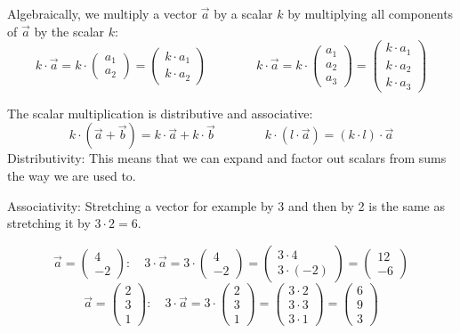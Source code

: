 \documentclass[12pt,eng]{skript_ogg}
\begin{document}
\begin{wichtig}
Algebraically, we multiply a vector $\vec{a}$ by a scalar $k$ by multiplying all components of $\vec{a}$ by the scalar $k$:
\[k\cdot\vec{a}=k\cdot
\begin{pmatrix}
a_1\\a_2
\end{pmatrix}=\begin{pmatrix}
k\cdot a_1\\k\cdot a_2
\end{pmatrix}\qquad\qquad k\cdot\vec{a}=k\cdot
\begin{pmatrix}
a_1\\a_2\\a_3
\end{pmatrix}=\begin{pmatrix}
k\cdot a_1\\k\cdot a_2\\k\cdot a_3
\end{pmatrix}\]
\end{wichtig}

\begin{bemerkung}
The scalar multiplication is distributive and associative:
\[k\cdot(\vec{a}+\vec{b})=k\cdot\vec{a}+k\cdot\vec{b}\qquad\qquad k\cdot(l\cdot\vec{a})=(k\cdot l)\cdot\vec{a}\]
Distributivity: This means that we can expand and factor out scalars from sums the way we are used to.

Associativity: Stretching a vector for example by 3 and then by 2 is the same as stretching it by $3\cdot2=6$.
\end{bemerkung}

\begin{beispiel} 
\[\vec{a}=\begin{pmatrix}4\\-2\end{pmatrix}:\quad3\cdot\vec{a}=3\cdot\begin{pmatrix}4\\-2\end{pmatrix}=\begin{pmatrix}3\cdot4\\3\cdot(-2)\end{pmatrix}=\begin{pmatrix}12\\-6\end{pmatrix}\]
\[\vec{a}=\begin{pmatrix}2\\3\\1\end{pmatrix}:\quad3\cdot\vec{a}=3\cdot\begin{pmatrix}2\\3\\1\end{pmatrix}=\begin{pmatrix}3\cdot2\\3\cdot3\\3\cdot1\end{pmatrix}=\begin{pmatrix}6\\9\\3\end{pmatrix}\]
\end{beispiel}
\end{document}
